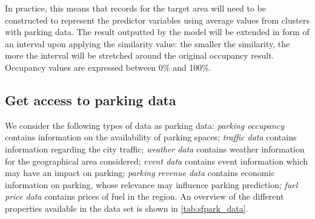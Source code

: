 \documentclass{ws-ijait}
\begin{document}
\begin{enumerate}[label=\Roman*]
		In practice, this means that records for the target area will need to be constructed to represent the predictor variables using average values from clusters with parking data. The result outputted by the model will be extended in form of an interval upon applying the similarity value: the smaller the similarity, the more the interval will be stretched around the original occupancy result. Occupancy values are expressed between 0\% and 100\%.
		
	\end{enumerate}
	
	\subsection{Get access to parking data}
	We consider the following types of data as parking data: \textit{parking occupancy} contains information on the availability of parking spaces; \textit{traffic data} contains information regarding the city traffic; \textit{weather data} contains weather information for the geographical area considered; \textit{event data} contains event information which may have an impact on parking; \textit{parking revenue data} contains economic information on parking, whose relevance may influence parking prediction; \textit{fuel price data} contains prices of fuel in the region. An overview of the different properties available in the data set is shown in \cref{tab:sfpark_data}.
	
\end{document}
